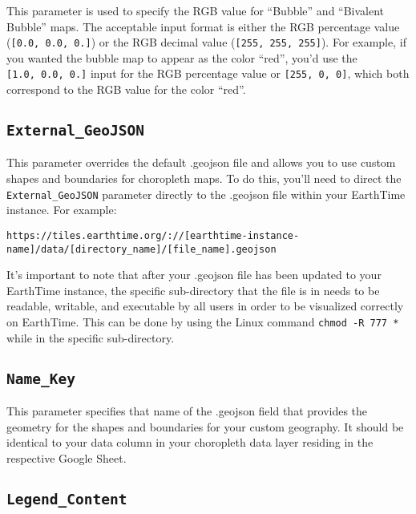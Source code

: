 \documentclass[
]{book}
\begin{document}
This parameter is used to specify the RGB value for ``Bubble'' and ``Bivalent Bubble'' maps. The acceptable input format is either the RGB percentage value (\texttt{{[}0.0,\ 0.0,\ 0.{]}}) or the RGB decimal value (\texttt{{[}255,\ 255,\ 255{]}}). For example, if you wanted the bubble map to appear as the color ``red'', you'd use the \texttt{{[}1.0,\ 0.0,\ 0.{]}} input for the RGB percentage value or \texttt{{[}255,\ 0,\ 0{]}}, which both correspond to the RGB value for the color ``red''.

\hypertarget{external_geojson}{%
\subsection*{\texorpdfstring{\texttt{External\_GeoJSON}}{External\_GeoJSON}}\label{external_geojson}}


This parameter overrides the default .geojson file and allows you to use custom shapes and boundaries for choropleth maps. To do this, you'll need to direct the \texttt{External\_GeoJSON} parameter directly to the .geojson file within your EarthTime instance. For example:

\texttt{https://tiles.earthtime.org/://{[}earthtime-instance-name{]}/data/{[}directory\_name{]}/{[}file\_name{]}.geojson}

It's important to note that after your .geojson file has been updated to your EarthTime instance, the specific sub-directory that the file is in needs to be readable, writable, and executable by all users in order to be visualized correctly on EarthTime. This can be done by using the Linux command \texttt{chmod\ -R\ 777\ *} while in the specific sub-directory.

\hypertarget{name_key}{%
\subsection*{\texorpdfstring{\texttt{Name\_Key}}{Name\_Key}}\label{name_key}}


This parameter specifies that name of the .geojson field that provides the geometry for the shapes and boundaries for your custom geography. It should be identical to your data column in your choropleth data layer residing in the respective Google Sheet.

\hypertarget{legend_content}{%
\subsection*{\texorpdfstring{\texttt{Legend\_Content}}{Legend\_Content}}\label{legend_content}}
\end{document}
